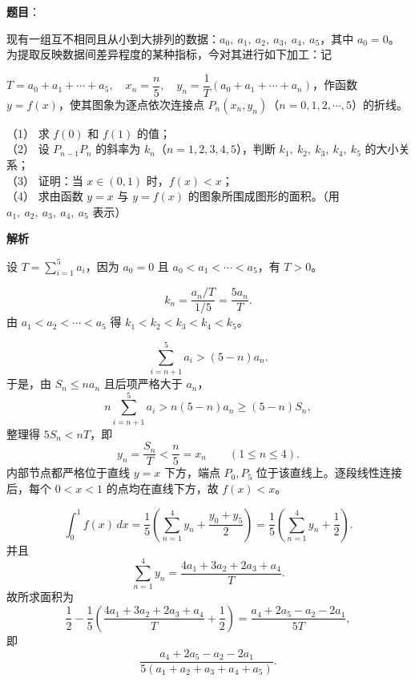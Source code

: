 \begin{answer}

\textbf{题目}：

现有一组互不相同且从小到大排列的数据：$a_0,\ a_1,\ a_2,\ a_3,\ a_4,\ a_5$，其中 $a_0=0$。为提取反映数据间差异程度的某种指标，今对其进行如下加工：记

$T=a_0+a_1+\cdots+a_5,\quad x_n=\dfrac n5,\quad y_n=\dfrac1T(a_0+a_1+\cdots+a_n)$，作函数 $y=f(x)$，使其图象为逐点依次连接点 $P_n(x_n,y_n)$（$n=0,1,2,\cdots,5$）的折线。

（1） 求 $f(0)$ 和 $f(1)$ 的值；\\
（2） 设 $P_{n-1}P_n$ 的斜率为 $k_n$（$n=1,2,3,4,5$），判断 $k_1,\ k_2,\ k_3,\ k_4,\ k_5$ 的大小关系；\\
（3） 证明：当 $x\in(0,1)$ 时，$f(x)<x$；\\
（4） 求由函数 $y=x$ 与 $y=f(x)$ 的图象所围成图形的面积。（用 $a_1,\ a_2,\ a_3,\ a_4,\ a_5$ 表示）

\textbf{解析}

设 $T=\sum_{i=1}^5a_i$，因为 $a_0=0$ 且 $a_0<a_1<\cdots<a_5$，有 $T>0$。


\nopagebreak[4]
\[k_n=\frac{a_n/T}{1/5}=\frac{5a_n}{T}.\]
由 $a_1<a_2<\cdots<a_5$ 得 $k_1<k_2<k_3<k_4<k_5$。

\nopagebreak[4]
\[\sum_{i=n+1}^5a_i>(5-n)a_n.\]
于是，由 $S_n\le na_n$ 且后项严格大于 $a_n$，
\nopagebreak[4]
\[n\sum_{i=n+1}^5a_i>n(5-n)a_n\ge(5-n)S_n,\]
整理得 $5S_n<nT$，即
\nopagebreak[4]
\[y_n=\frac{S_n}{T}<\frac n5=x_n\qquad(1\le n\le4).\]
内部节点都严格位于直线 $y=x$ 下方，端点 $P_0,P_5$ 位于该直线上。逐段线性连接后，每个 $0<x<1$ 的点均在直线下方，故 $f(x)<x$。

\nopagebreak[4]
\[\int_0^1f(x)\,dx=\frac15\left(\sum_{n=1}^4y_n+\frac{y_0+y_5}{2}\right)
=\frac15\left(\sum_{n=1}^4y_n+\frac12\right).\]
并且
\nopagebreak[4]
\[\sum_{n=1}^4y_n
=\frac{4a_1+3a_2+2a_3+a_4}{T}.\]
故所求面积为
\nopagebreak[4]
\[\frac12-\frac15\left(\frac{4a_1+3a_2+2a_3+a_4}{T}+\frac12\right)
=\frac{a_4+2a_5-a_2-2a_1}{5T},\]
即
\nopagebreak[4]
\[\frac{a_4+2a_5-a_2-2a_1}{5(a_1+a_2+a_3+a_4+a_5)}.\]





\end{answer}